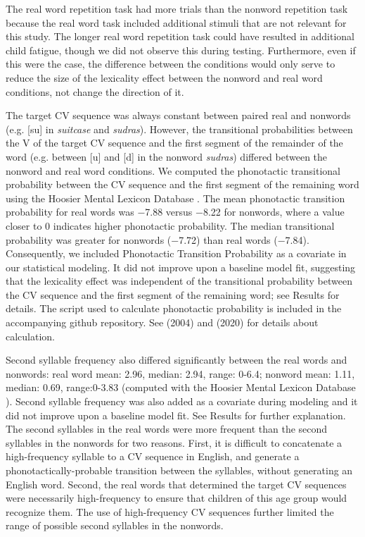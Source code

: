 \documentclass[a4paper,man,natbib,donotrepeattitle, apacite]{apa6}
\begin{document}
The real word repetition task had more trials than the nonword repetition task because the real word task included additional stimuli that are not relevant for this study. The longer real word repetition task could have resulted in additional child fatigue, though we did not observe this during testing. Furthermore, even if this were the case, the difference between the conditions would only serve to reduce the size of the lexicality effect between the nonword and real word conditions, not change the direction of it. 

The target CV sequence was always constant between paired real and nonwords (e.g. [su] in \textit{suitcase} and \textit{sudras}). However, the transitional probabilities between the V of the target CV sequence and the first segment of the remainder of the word (e.g. between [u] and [d] in the nonword \textit{sudras}) differed between the nonword and real word conditions. We computed the phonotactic transitional probability between the CV sequence and the first segment of the remaining word using the Hoosier Mental Lexicon Database \cite{pisoniSpeechPerceptionWord1985}. The mean phonotactic transition probability for real words was −7.88 versus −8.22 for nonwords, where a value closer to 0 indicates higher phonotactic probability. The median transitional probability was greater for nonwords (−7.72) than real words (−7.84). Consequently, we included Phonotactic Transition Probability as a covariate in our statistical modeling. It did not improve upon a baseline model fit, suggesting that the lexicality effect was independent of the transitional probability between the CV sequence and the first segment of the remaining word; see Results for details. The script used to calculate phonotactic probability is included in the accompanying github repository. See \citeauthor{edwardsInteractionVocabularySize2004} (2004) and \citeauthor{cychoszLexicalAdvantageFouryearold2020} (2020) for details about calculation. 

Second syllable frequency also differed significantly between the real words and nonwords: real word mean: 2.96, median: 2.94, range: 0-6.4; nonword mean: 1.11, median: 0.69, range:0-3.83 (computed with the Hoosier Mental Lexicon Database \cite{pisoniSpeechPerceptionWord1985}). Second syllable frequency was also added as a covariate during modeling and it did not improve upon a baseline model fit. See Results for further explanation. The second syllables in the real words were more frequent than the second syllables in the nonwords for two reasons. First, it is difficult to concatenate a high-frequency syllable to a CV sequence in English, and generate a phonotactically-probable transition between the syllables, without generating an English word. Second, the real words that determined the target CV sequences were necessarily high-frequency to ensure that children of this age group would recognize them. The use of high-frequency CV sequences further limited the range of possible second syllables in the nonwords. 
\end{document}
